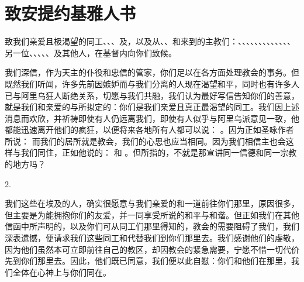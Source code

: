 
\chapter{致安提约基雅人书}


致我们亲爱且极渴望的同工、、、及，以及从、、和来到的主教们：、、、、、、、、、、、、、另一位、、、、、及其他人，在基督内向你们致候。\par

我们深信，作为天主的仆役和忠信的管家，你们足以在各方面处理教会的事务。但既然我们听闻，许多先前因嫉妒而与我们分离的人现在渴望和平，同时也有许多人已与阿里乌狂人断绝关系，切愿与我们共融，我们认为最好写信告知你们的善意，就是我们和亲爱的与所拟定的：你们是我们亲爱且真正最渴望的同工。我们因上述消息而欢欣，并祈祷即使有人仍远离我们，即使有人似乎与阿里乌派意见一致，他都能迅速离开他们的疯狂，以便将来各地所有人都可以说： 。因为正如圣咏作者所说：  而我们的居所就是教会，我们的心思也应当相同。因为我们相信主也会这样与我们同住，正如他说的：  和 。但所指的，不就是那宣讲同一信德和同一宗教的地方吗？\par

2. \par

我们这些在埃及的人，确实很愿意与我们亲爱的和一道前往你们那里，原因很多，但主要是为能拥抱你们的友爱，并一同享受所说的和平与和谐。但正如我们在其他信函中所声明的，以及你们可从同工们那里得知的，教会的需要阻碍了我们，我们深表遗憾，便请求我们这些同工和代替我们到你们那里去。我们感谢他们的虔敬，因为他们虽然本可立即前往自己的教区，却因教会的紧急需要，宁愿不惜一切代价先到你们那里去。因此，他们既已同意，我们便以此自慰：你们和他们在那里，我们全体在心神上与你们同在。\par

